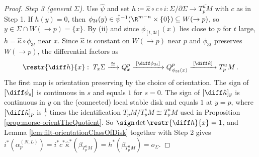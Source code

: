 \begin{proof}
	\emph{Step 3 (general $\Sigma$).} Use $\hat\psi$ and set $h\coloneq\hat\kappa\circ c\circ i:\Sigma/\partial\Sigma\to\overline{T^u_pM}$ with $c$ as in Step 1. If $h(y)=0$, then $\phi_{3t}(y)\in\hat\psi^{-1}(\R^{m-n}\times\{0\})\subseteq W(\to p)$, so $y\in\Sigma\cap W(\to p)=\{x\}$. By (ii) and since $\phi_{[t,3t]}(x)$ lies close to $p$ for $t$ large, $h=\hat\kappa\circ\phi_{3t}$ near $x$. Since $\hat\kappa$ is constant on $W(\to p)$ near $p$ and $\phi_{3t}$ preserves $W(\to p)$, the differential factors as
	\begin{equation*}
		\restr{\diff h}{x}:\;T_x\Sigma\xrightarrow{\;\cong\;}Q^p_x\xrightarrow{\;[\diff\phi_{3t}]\;}Q^p_{\phi_{3t}(x)}\xrightarrow{\;[\diff\hat\kappa]\;}T^u_pM\,.
	\end{equation*}
	The first map is orientation preserving by the choice of orientation. The sign of $[\diff\phi_s]$ is continuous in $s$ and equals $1$ for $s=0$. The sign of $[\diff\hat\kappa]_y$ is continuous in $y$ on the (connected) local stable disk and equals $1$ at $y=p$, where $[\diff\hat\kappa]_p$ is $\frac1\epsilon$ times the identification $T_pM/T^s_pM\cong T^u_pM$ used in Proposition \ref{prop:morse-orientTheQuotient}. So $\sign\det\restr{\diff h}{x}=1$, and Lemma \ref{lem:filt-orientationClassOfDisk} together with Step 2 gives $i^*(\alpha_p^{(N,L)})=i^*c^*\hat\kappa^*(\beta_{T^u_pM})=h^*(\beta_{T^u_pM})=o_\Sigma$.
\end{proof}


